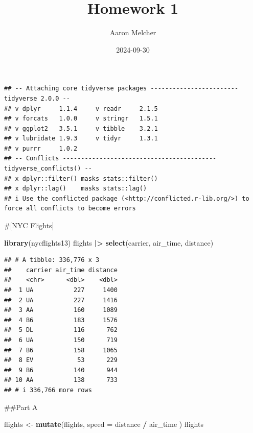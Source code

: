 \documentclass[
]{article}
\title{Homework 1}
\author{Aaron Melcher}
\date{2024-09-30}
\newenvironment{Shaded}{\begin{snugshade}}{\end{snugshade}}
\newcommand{\AttributeTok}[1]{\textcolor[rgb]{0.13,0.29,0.53}{#1}}
\newcommand{\FunctionTok}[1]{\textcolor[rgb]{0.13,0.29,0.53}{\textbf{#1}}}
\newcommand{\NormalTok}[1]{#1}
\newcommand{\OtherTok}[1]{\textcolor[rgb]{0.56,0.35,0.01}{#1}}
\newcommand{\SpecialCharTok}[1]{\textcolor[rgb]{0.81,0.36,0.00}{\textbf{#1}}}
\begin{document}
\maketitle

\begin{verbatim}
## -- Attaching core tidyverse packages ------------------------ tidyverse 2.0.0 --
## v dplyr     1.1.4     v readr     2.1.5
## v forcats   1.0.0     v stringr   1.5.1
## v ggplot2   3.5.1     v tibble    3.2.1
## v lubridate 1.9.3     v tidyr     1.3.1
## v purrr     1.0.2     
## -- Conflicts ------------------------------------------ tidyverse_conflicts() --
## x dplyr::filter() masks stats::filter()
## x dplyr::lag()    masks stats::lag()
## i Use the conflicted package (<http://conflicted.r-lib.org/>) to force all conflicts to become errors
\end{verbatim}

\#{[}NYC Flights{]}

\begin{Shaded}
\begin{Highlighting}[]
\FunctionTok{library}\NormalTok{(nycflights13)}
\NormalTok{flights }\SpecialCharTok{|\textgreater{}} \FunctionTok{select}\NormalTok{(carrier, air\_time, distance)}
\end{Highlighting}
\end{Shaded}

\begin{verbatim}
## # A tibble: 336,776 x 3
##    carrier air_time distance
##    <chr>      <dbl>    <dbl>
##  1 UA           227     1400
##  2 UA           227     1416
##  3 AA           160     1089
##  4 B6           183     1576
##  5 DL           116      762
##  6 UA           150      719
##  7 B6           158     1065
##  8 EV            53      229
##  9 B6           140      944
## 10 AA           138      733
## # i 336,766 more rows
\end{verbatim}

\#\#Part A

\begin{Shaded}
\begin{Highlighting}[]
\NormalTok{flights }\OtherTok{\textless{}{-}} \FunctionTok{mutate}\NormalTok{(flights,}
  \AttributeTok{speed =}\NormalTok{ distance }\SpecialCharTok{/}\NormalTok{ air\_time}
\NormalTok{)}
\NormalTok{flights}
\end{Highlighting}
\end{Shaded}
\end{document}
